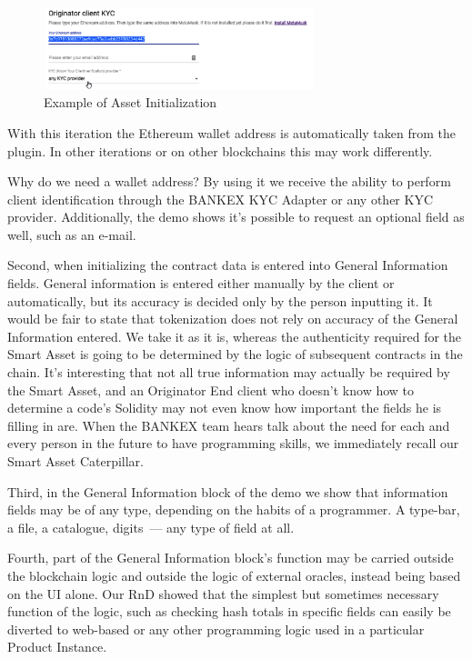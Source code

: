 \documentclass{article}
\begin{document}
\begin{multicols}{2}
\begin{figure}
  \centering
  \includegraphics[width=0.7\textwidth]{originator-client-kyc.png}
  \caption{Example of Asset Initialization}
  \label{fig:originator-client-kyc}
\end{figure}

With this iteration the Ethereum wallet address is automatically taken from the plugin. In other iterations or on other blockchains this may work differently.

Why do we need a wallet address? By using it we receive the ability to perform client identification through the BANKEX KYC Adapter or any other KYC provider. Additionally, the demo shows it's possible to request an optional field as well, such as an e-mail. 

Second, when initializing the contract data is entered into General Information fields. General information is entered either manually by the client or automatically, but its accuracy is decided only by the person inputting it. It would be fair to state that tokenization does not rely on accuracy of the General Information entered. We take it as it is, whereas the authenticity required for the Smart Asset is going to be determined by the logic of subsequent contracts in the chain. It's interesting that not all true information may actually be required by the Smart Asset, and an Originator End client who doesn't know how to determine a code's Solidity may not even know how important the fields he is filling in are. When the BANKEX team hears talk about the need for each and every person in the future to have programming skills, we immediately recall our Smart Asset Caterpillar.

Third, in the General Information block of the demo we show that information fields may be of any type, depending on the habits of a programmer. A type-bar, a file, a catalogue, digits~--- any type of field at all. 

Fourth, part of the General Information block's function may be carried outside the blockchain logic and outside the logic of external oracles, instead being based on the UI alone. Our RnD showed that the simplest but sometimes necessary function of the logic, such as checking hash totals in specific fields can easily be diverted to web-based or any other programming logic used in a particular Product Instance. 


\end{multicols}
\end{document}
